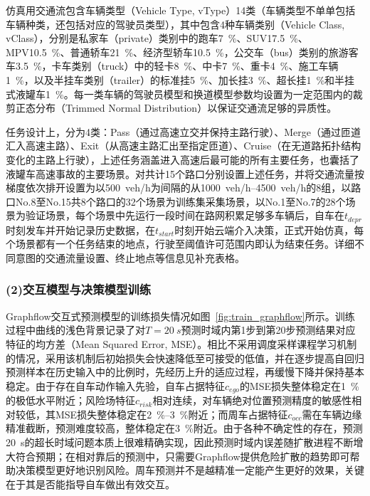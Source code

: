       仿真用交通流包含车辆类型（Vehicle Type, vType）14类（车辆类型不单单包括车辆种类，还包括对应的驾驶员类型），其中包含4种车辆类别（Vehicle Class, vClass），分别是私家车（private）类别中的跑车\SI{7}{\percent}、SUV\SI{17.5}{\percent}、MPV\SI{10.5}{\percent}、普通轿车\SI{21}{\percent}、经济型轿车\SI{10.5}{\percent}，公交车（bus）类别的旅游客车\SI{3.5}{\percent}，卡车类别（truck）中的轻卡\SI{8}{\percent}、中卡\SI{7}{\percent}、重卡\SI{4}{\percent}、施工车辆\SI{1}{\percent}，以及半挂车类别（trailer）的标准挂\SI{5}{\percent}、加长挂\SI{3}{\percent}、超长挂\SI{1}{\percent}和半挂式液罐车\SI{1}{\percent}\cite{rioh_2023_traffic_volume,mot_2024_traffic}。每一类车辆的驾驶员模型和换道模型参数均设置为一定范围内的裁剪正态分布（Trimmed Normal Distribution）以保证交通流足够的异质性。

      任务设计上，分为4类：Pass（通过高速立交并保持主路行驶）、Merge（通过匝道汇入高速主路）、Exit（从高速主路汇出至指定匝道）、Cruise（在无道路拓扑结构变化的主路上行驶），上述任务涵盖进入高速后最可能的所有主要任务，也囊括了液罐车高速事故的主要场景。对共计15个路口分别设置上述任务，并将交通流量按梯度依次排开设置为以\SI{500}{veh/h}为间隔的从\SIrange{1000}{4500}{veh/h}的8组，以路口No.8至No.15共8个路口的32个场景为训练集采集场景，以No.1至No.7的28个场景为验证场景，每个场景中先运行一段时间在路网积累足够多车辆后，自车在$t_{depr}$时刻发车并开始记录历史数据，在$t_{start}$时刻开始云端介入决策，正式开始仿真，每个场景都有一个任务结束的地点，行驶至阈值许可范围内即认为结束任务。详细不同意图的交通流量设置、终止地点等信息见补充表格\cite{KomasaQi2026MasterThesis_repo}。

    \subsubsection*{(2)交互模型与决策模型训练}
      Graphflow交互式预测模型的训练损失情况如图~\ref{fig:train_graphflow}所示。训练过程中曲线的浅色背景记录了对$T=\SI{20}{s}$预测时域内第1步到第20步预测结果对应特征的均方差（Mean Squared Error, MSE）。相比不采用调度采样课程学习机制的情况，采用该机制后初始损失会快速降低至可接受的低值，并在逐步提高自回归预测样本在历史输入中的比例时，先经历上升的适应过程，再缓慢下降并保持基本稳定。由于存在自车动作输入先验，自车占据特征$c_{ego}$的MSE损失整体稳定在\SI{1}{\percent}的极低水平附近；风险场特征$c_{risk}$相对连续，对车辆绝对位置预测精度的敏感性相对较低，其MSE损失整体稳定在\SIrange{2}{3}{\percent}附近；而周车占据特征$c_{occ}$需在车辆边缘精准截断，预测难度较高，整体稳定在\SI{3}{\percent}附近。由于各种不确定性的存在，预测\SI{20}{s}的超长时域问题本质上很难精确实现，因此预测时域内误差随扩散进程不断增大符合预期；在相对靠后的预测中，只需要Graphflow提供危险扩散的趋势即可帮助决策模型更好地识别风险。周车预测并不是越精准一定能产生更好的效果\cite{pred_neq_drive_tran2023what}，关键在于其是否能指导自车做出有效交互。

